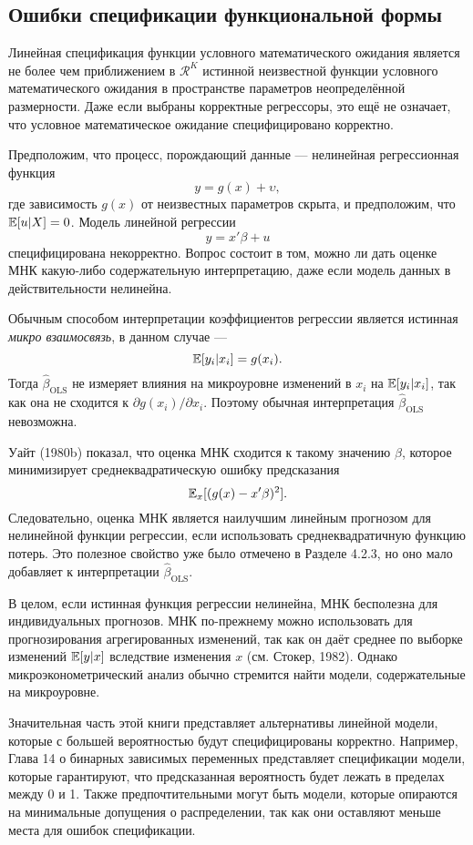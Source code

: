 \subsection{Ошибки спецификации функциональной формы}

Линейная спецификация функции условного математического ожидания является не более чем приближением в $\mathcal{R}^K$ истинной неизвестной функции условного математического ожидания в пространстве параметров неопределённой размерности. Даже если выбраны корректные регрессоры, это ещё не означает, что условное математическое ожидание специфицировано корректно.

Предположим, что процесс, порождающий данные --- нелинейная регрессионная функция 
$$ y = g(x) + \upsilon, $$
где зависимость $g(x)$ от неизвестных параметров скрыта, и предположим, что $\mathbb{E}[u|X] = 0$. Модель линейной регрессии
$$ y = x'\beta +u$$
специфицирована некорректно. Вопрос состоит в том, можно ли дать оценке МНК какую-либо содержательную интерпретацию, даже если модель данных в действительности нелинейна.

Обычным способом интерпретации коэффициентов регрессии является истинная \textit{микро взаимосвязь}, в данном случае ---
$$\mathbb{E}[y_i|x_i] = g(x_i).$$
Тогда $\hat{\beta}_{\text{OLS}}$ не измеряет влияния на микроуровне изменений в $x_i$ на $\mathbb{E}[y_i|x_i]$, так как она не сходится к $\partial g(x_i)/\partial x_i$. Поэтому обычная интерпретация $\hat{\beta}_{\text{OLS}}$ невозможна.

Уайт (1980b) показал, что оценка МНК сходится к такому значению $\beta$, которое минимизирует среднеквадратическую ошибку предсказания
$$\mathbb{E}_x[(g(x)-x'\beta)^2].$$
Следовательно, оценка МНК является наилучшим линейным прогнозом для нелинейной функции регрессии, если использовать среднеквадратичную функцию потерь. Это полезное свойство уже было отмечено в Разделе 4.2.3, но оно мало добавляет к интерпретации $\hat{\beta}_{\text{OLS}}$.

В целом, если истинная функция регрессии нелинейна, МНК бесполезна для индивидуальных прогнозов. МНК по-прежнему можно использовать для прогнозирования агрегированных изменений, так как он даёт среднее по выборке изменений $\mathbb{E} [y|x]$ вследствие изменения $x$ (см. Стокер, 1982). Однако микроэконометрический анализ обычно стремится найти модели, содержательные на микроуровне.

Значительная часть этой книги представляет альтернативы линейной модели, которые с большей вероятностью будут специфицированы корректно. Например, Глава 14 о бинарных зависимых переменных представляет спецификации модели, которые гарантируют, что предсказанная вероятность будет лежать в пределах между 0 и 1. Также предпочтительными могут быть модели, которые опираются на минимальные допущения о распределении, так как они оставляют меньше места для ошибок спецификации.

